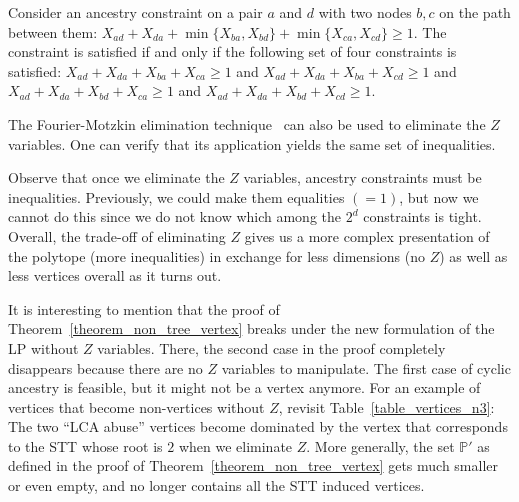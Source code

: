 \begin{example}
\label{example_Z_elimination}
Consider an ancestry constraint on a pair $a$ and $d$ with two nodes $b,c$ on the path between them: $X_{ad} + X_{da} + \min\{ X_{ba},X_{bd} \} + \min\{ X_{ca},X_{cd} \} \ge 1$. The constraint is satisfied if and only if the following set of four constraints is satisfied:
$X_{ad} + X_{da} + X_{ba} + X_{ca} \ge 1$ and
$X_{ad} + X_{da} + X_{ba} + X_{cd} \ge 1$ and
$X_{ad} + X_{da} + X_{bd} + X_{ca} \ge 1$ and
$X_{ad} + X_{da} + X_{bd} + X_{cd} \ge 1$.
\end{example}

The Fourier-Motzkin elimination technique~\cite{BookForFourierMotzkin} can also be used to eliminate the $Z$ variables. One can verify that its application yields the same set of inequalities.

Observe that once we eliminate the $Z$ variables, ancestry constraints must be inequalities. Previously, we could make them equalities $(=1)$, but now we cannot do this since we do not know which among the $2^d$ constraints is tight. Overall, the trade-off of eliminating $Z$ gives us a more complex presentation of the polytope (more inequalities) in exchange for less dimensions (no $Z$) as well as less vertices overall as it turns out.

\begin{remark}
\label{remark_int_vertices_disappear_when_no_Z}
It is interesting to mention that the proof of Theorem~\ref{theorem_non_tree_vertex} breaks under the new formulation of the LP without $Z$ variables. There, the second case in the proof completely disappears because there are no $Z$ variables to manipulate. The first case of cyclic ancestry is feasible, but it might not be a vertex anymore. For an example of vertices that become non-vertices without $Z$, revisit Table~\ref{table_vertices_n3}: The two ``LCA abuse'' vertices become dominated by the vertex that corresponds to the STT whose root is $2$ when we eliminate $Z$. More generally, the set $\mathbb{P}'$ as defined in the proof of Theorem~\ref{theorem_non_tree_vertex} gets much smaller or even empty, and no longer contains all the STT induced vertices.
\end{remark}




